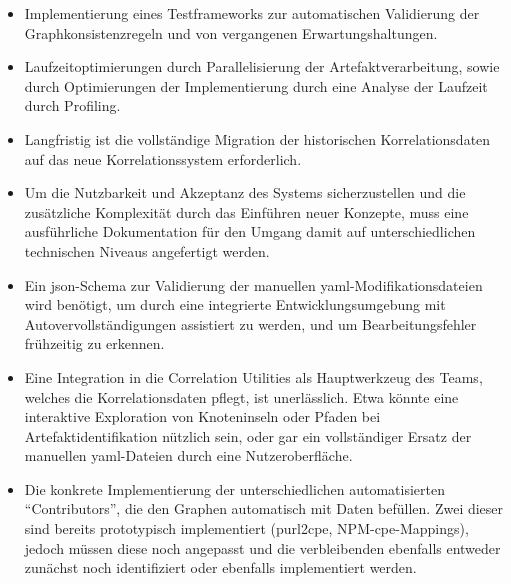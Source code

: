 \begin{itemize}
    \itemsep0em
    \item Implementierung eines Testframeworks zur automatischen Validierung der Graphkonsistenzregeln und von vergangenen Erwartungshaltungen.
    \item Laufzeitoptimierungen durch Parallelisierung der Artefaktverarbeitung, sowie durch Optimierungen der Implementierung durch eine Analyse der Laufzeit durch Profiling.
    \item Langfristig ist die vollständige Migration der historischen Korrelationsdaten auf das neue Korrelationssystem erforderlich.
    \item Um die Nutzbarkeit und Akzeptanz des Systems sicherzustellen und die zusätzliche Komplexität durch das Einführen neuer Konzepte, muss eine ausführliche Dokumentation für den Umgang damit auf unterschiedlichen technischen Niveaus angefertigt werden.
    \item Ein \acrshort{json}-Schema zur Validierung der manuellen \acrshort{yaml}-Modifikationsdateien wird benötigt, um durch eine integrierte Entwicklungsumgebung mit Autovervollständigungen assistiert zu werden, und um Bearbeitungsfehler frühzeitig zu erkennen.
    \item Eine Integration in die Correlation Utilities als Hauptwerkzeug des Teams, welches die Korrelationsdaten pflegt, ist unerlässlich.
    Etwa könnte eine interaktive Exploration von Knoteninseln oder Pfaden bei Artefaktidentifikation nützlich sein, oder gar ein vollständiger Ersatz der manuellen \acrshort{yaml}-Dateien durch eine Nutzeroberfläche.
    \item Die konkrete Implementierung der unterschiedlichen automatisierten \enquote{Contributors}, die den Graphen automatisch mit Daten befüllen.
    Zwei dieser sind bereits prototypisch implementiert (purl2cpe, NPM-\acrshort{cpe}-Mappings), jedoch müssen diese noch angepasst und die verbleibenden ebenfalls entweder zunächst noch identifiziert oder ebenfalls implementiert werden.
\end{itemize}
